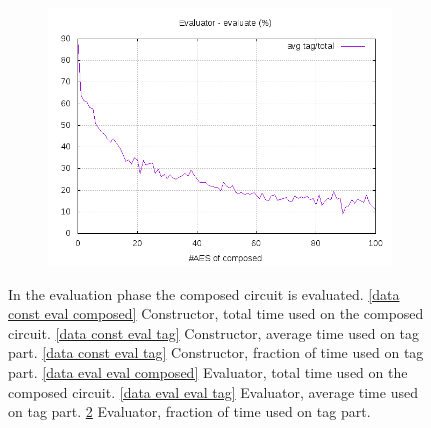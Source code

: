 \documentclass[10pt,a4paper]{article}
\begin{document}
\begin{figure}[h]
\begin{subfigure}[t]{0.3\textwidth}
        \includegraphics[width=\textwidth]{eval_eval_frac}
        \caption{}
        \label{data eval eval frac}
    \end{subfigure}
    \caption{In the evaluation phase the composed circuit is evaluated. \ref{data const eval composed} Constructor, total time used on the composed circuit. \ref{data const eval tag} Constructor, average time used on tag part. \ref{data const eval tag} Constructor, fraction of time used on tag part. \ref{data eval eval composed} Evaluator, total time used on the composed circuit. \ref{data eval eval tag} Evaluator, average time used on tag part. \ref{data eval eval frac} Evaluator, fraction of time used on tag part.}
\end{figure}
\end{document}
